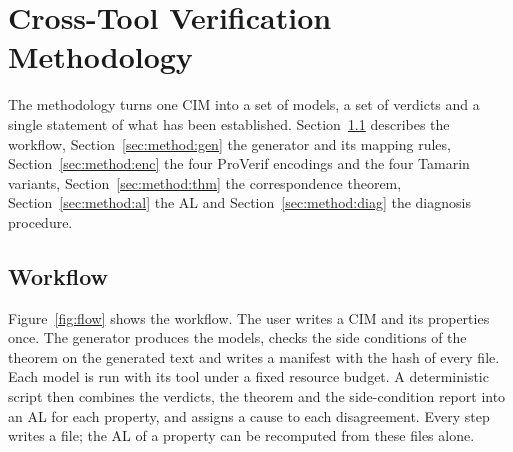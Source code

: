 \section{Cross-Tool Verification Methodology}\label{sec:method}

The methodology turns one CIM into a set of models, a set of verdicts and a single statement of what has been established. Section~\ref{sec:method:flow} describes the workflow, Section~\ref{sec:method:gen} the generator and its mapping rules, Section~\ref{sec:method:enc} the four ProVerif encodings and the four Tamarin variants, Section~\ref{sec:method:thm} the correspondence theorem, Section~\ref{sec:method:al} the AL and Section~\ref{sec:method:diag} the diagnosis procedure.

\subsection{Workflow}\label{sec:method:flow}

Figure~\ref{fig:flow} shows the workflow. The user writes a CIM and its properties once. The generator \cimc produces the models, checks the side conditions of the theorem on the generated text and writes a manifest with the hash of every file. Each model is run with its tool under a fixed resource budget. A deterministic script then combines the verdicts, the theorem and the side-condition report into an AL for each property, and assigns a cause to each disagreement. Every step writes a file; the AL of a property can be recomputed from these files alone.


